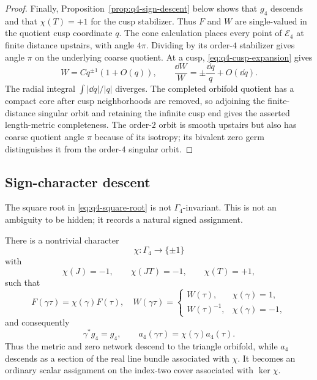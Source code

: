 \begin{proof}
Finally, Proposition~\ref{prop:q4-sign-descent} below shows that $g_4$ descends
and that $\chi(T)=+1$ for the cusp stabilizer.  Thus $F$ and $W$ are single-valued
in the quotient cusp coordinate $q$.  The cone calculation places every point of $\mathcal E_4$ at finite
distance upstairs, with angle $4\pi$.  Dividing by its order-$4$ stabilizer gives
angle $\pi$ on the underlying coarse quotient.  At a cusp,
\eqref{eq:q4-cusp-expansion} gives
\[
 W=Cq^{\pm1}(1+O(q)),
 \qquad
 \frac{\dd W}{W}=\pm\frac{\dd q}{q}+O(\dd q).
\]
The radial integral $\int|\dd q|/|q|$ diverges.  The completed orbifold quotient
has a compact core after cusp neighborhoods are removed, so adjoining the
finite-distance singular orbit and retaining the infinite cusp end gives the
asserted length-metric completeness.  The order-$2$ orbit is smooth upstairs but
also has coarse quotient angle $\pi$ because of its isotropy; its bivalent zero
germ distinguishes it from the order-$4$ singular orbit.
\end{proof}

\subsection{Sign-character descent}

The square root in \eqref{eq:q4-square-root} is not $\Gamma_4$-invariant.  This
is not an ambiguity to be hidden; it records a natural signed assignment.

\begin{proposition}
\label{prop:q4-sign-descent}
There is a nontrivial character
\[
 \chi:\Gamma_4\longrightarrow\{\pm1\}
\]
with
\begin{equation}
 \chi(J)=-1,
 \qquad \chi(JT)=-1,
 \qquad \chi(T)=+1,
 \label{eq:q4-sign-character-values}
\end{equation}
such that
\begin{equation}
 F(\gamma\tau)=\chi(\gamma)F(\tau),
 \quad
 W(\gamma\tau)=
 \begin{cases}W(\tau),&\chi(\gamma)=1,\\W(\tau)^{-1},&\chi(\gamma)=-1,
 \end{cases}
 \label{eq:q4-sign-action}
\end{equation}
and consequently
\begin{equation}
 \gamma^*g_4=g_4,
 \qquad
 a_4(\gamma\tau)=\chi(\gamma)a_4(\tau).
 \label{eq:q4-sign-descent}
\end{equation}
Thus the metric and zero network descend to the triangle orbifold, while $a_4$
descends as a section of the real line bundle associated with $\chi$.  It becomes
an ordinary scalar assignment on the index-two cover associated with
$\ker\chi$.
\end{proposition}

